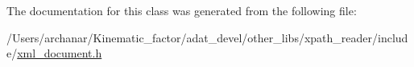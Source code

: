 The documentation for this class was generated from the following file\+:\begin{DoxyCompactItemize}
\item 
/\+Users/archanar/\+Kinematic\+\_\+factor/adat\+\_\+devel/other\+\_\+libs/xpath\+\_\+reader/include/\mbox{\hyperlink{other__libs_2xpath__reader_2include_2xml__document_8h}{xml\+\_\+document.\+h}}\end{DoxyCompactItemize}

